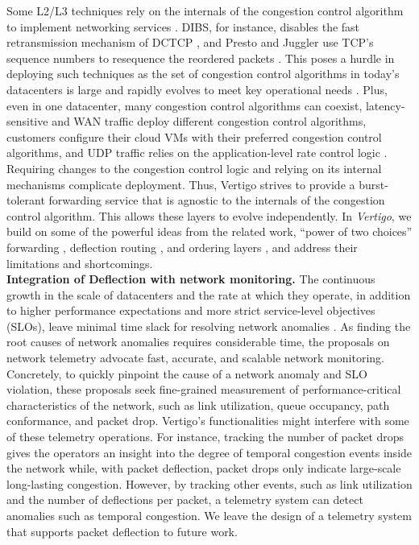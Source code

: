 Some L2/L3 techniques rely on the internals of the congestion control algorithm to implement networking services \cite{dibs, juggler, presto}. DIBS, for instance, disables the fast retransmission mechanism of DCTCP \cite{dibs}, and Presto and Juggler use TCP's sequence numbers to resequence the reordered packets \cite{presto, juggler}.
This poses a hurdle in deploying such techniques as the set of congestion control algorithms in today's datacenters is large and rapidly evolves to meet key operational needs \cite{swift,snap, hpcc}. Plus, even in one datacenter, many congestion control algorithms can coexist, \eg latency-sensitive and WAN traffic deploy different congestion control algorithms, customers configure their cloud VMs with their preferred congestion control algorithms, and UDP traffic relies on the application-level rate control logic \cite{swift}. Requiring changes to the congestion control logic and relying on its internal mechanisms complicate deployment. Thus, Vertigo strives to provide a burst-tolerant forwarding service that is agnostic to the internals of the congestion control algorithm. This allows these layers to evolve independently.
%
In \textit{Vertigo}, we build on some of the powerful ideas from the related work, \eg ``power of two choices'' forwarding \cite{drill}, deflection routing \cite{dibs}, and ordering layers \cite{juggler}, and address their limitations and shortcomings. 
\\
\textbf{Integration of Deflection with network monitoring.} The continuous growth in the scale of datacenters and the rate at which they operate, in addition to higher performance expectations and more strict service-level objectives (SLOs), leave minimal time slack for resolving network anomalies \cite{netseer, intsight}. As finding the root causes of network anomalies requires considerable time, the proposals on network telemetry \cite{int, netseer, pint, intsight} advocate fast, accurate, and scalable network monitoring. Concretely, to quickly pinpoint the cause of a network anomaly and SLO violation, these proposals seek fine-grained measurement of performance-critical characteristics of the network, such as link utilization, queue occupancy, path conformance, and packet drop. Vertigo's functionalities might interfere with some of these telemetry operations. For instance, tracking the number of packet drops gives the operators an insight into the degree of temporal congestion events inside the network while, with packet deflection, packet drops only indicate large-scale long-lasting congestion. However, by tracking other events, such as link utilization and the number of deflections per packet, a telemetry system can detect anomalies such as temporal congestion. We leave the design of a telemetry system that supports packet deflection to future work.

